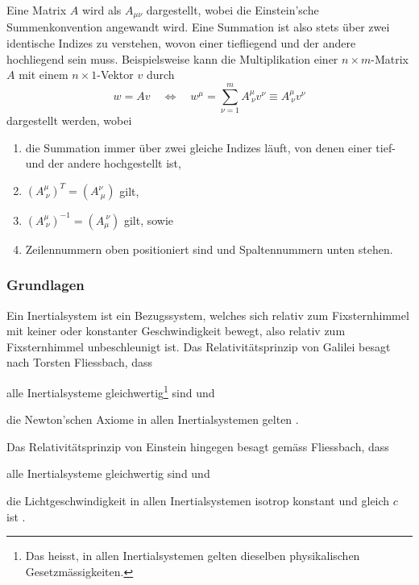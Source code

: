 \documentclass[a4paper,12pt]{article}
\numberwithin{equation}{section}
\renewcommand{\theenumi}{(\arabic{enumi})}
\renewcommand\labelenumi{\theenumi} %
\begin{document}
Eine Matrix $A$ wird als $A_{\mu\nu}$ dargestellt, wobei die Einstein'sche Summenkonvention angewandt wird. Eine Summation ist also stets über zwei identische Indizes zu verstehen, wovon einer tiefliegend und der andere hochliegend sein muss. Beispielsweise kann die Multiplikation einer $n\times m$-Matrix $A$ mit einem $n\times 1$-Vektor $v$ durch \begin{equation}
w = Av \quad \Leftrightarrow \quad w^\mu =\sum_{\nu = 1}^{m}A^\mu_{\ \nu} v^\nu \equiv A^\mu_{\ \nu} v^\nu
\end{equation} dargestellt werden, wobei \begin{enumerate}
\item die Summation immer über zwei gleiche Indizes läuft, von denen einer tief- und der andere hochgestellt ist,
\item $(A^\mu_{\ \nu})^T = (A^\nu_{\ \mu})$ gilt,
\item $(A^\mu_{\ \nu})^{-1} = (A_\mu^{\ \nu})$ gilt, sowie
\item Zeilennummern oben positioniert sind und Spaltennummern unten stehen.
\end{enumerate}

\subsubsection{Grundlagen}
Ein Inertialsystem ist ein Bezugssystem, welches sich relativ zum Fixsternhimmel mit keiner oder konstanter Geschwindigkeit bewegt, also relativ zum Fixsternhimmel unbeschleunigt ist. Das Relativitätsprinzip von Galilei besagt nach Torsten Fliessbach, dass \begin{enumerate*}
\renewcommand{\theenumi}{(G\arabic{enumi})}
\renewcommand\labelenumi{\theenumi}\item \label{Galileo1} alle Inertialsysteme gleichwertig\footnote{Das heisst, in allen Inertialsystemen gelten dieselben physikalischen Gesetzmässigkeiten.} sind und \item \label{Galileo2} die Newton'schen Axiome in allen Inertialsystemen gelten \cite[S.333]{Fliebach.1996}.
\end{enumerate*} Das Relativitätsprinzip von Einstein hingegen besagt gemäss Fliessbach, dass \begin{enumerate*}
\renewcommand{\theenumi}{(E\arabic{enumi})}
\renewcommand\labelenumi{\theenumi}\item \label{Einstein1} alle Inertialsysteme gleichwertig sind und \item \label{Einstein2} die Lichtgeschwindigkeit in allen Inertialsystemen isotrop konstant und gleich $c$ ist \cite[S.335]{Fliebach.1996}.
\end{enumerate*}
\end{document}
